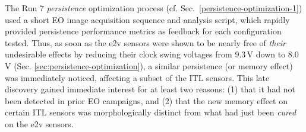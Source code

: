 The Run 7 {\it persistence} optimization process (cf. Sec.~\ref{persistence-optimization-1}) used a short EO image acquisition sequence and analysis script, which rapidly provided persistence performance metrics as feedback for each configuration tested. Thus, as soon as the e2v sensors were shown to be nearly free of {\it their} undesirable effects by reducing their clock swing voltages from 9.3\,V down to 8.0\,V (Sec. \ref{sec:persistence-optimization}), a similar persistence (or memory effect) was immediately noticed, affecting a subset of the ITL sensors. This late discovery gained immediate interest for at least two reasons: (1) that it had not been detected in prior EO campaigns, and (2) that the new memory effect on certain ITL sensors was morphologically distinct from what had just been {\it cured} on the e2v sensors.

